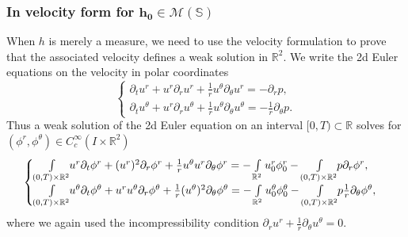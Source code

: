 \documentclass[JEP,XML,SOM,Unicode,NoFloatCountersInSection,published]{cedram}
\theoremstyle{plain}
\theoremstyle{definition}
\newcommand{\bbR}{\mathbb R}
\begin{document}
\subsubsection{In velocity form for $\boldsymbol{h_0\in \mathcal{M}\left(\mathbb{S}\right)}$}

When $h$ is merely a measure, we need to use the velocity formulation to prove that the associated velocity defines a weak solution in $\bbR^2$. We write the 2d Euler equations on the velocity in polar coordinates
\[
\begin{cases}
\partial_t u^r+u^r\partial_ru^r+\frac{1}{r}u^\theta \partial_\theta u^r=-\partial_r p,\\
\partial_t u^\theta+u^r\partial_ru^\theta+\frac{1}{r}u^\theta \partial_\theta u^\theta=-\frac{1}{r}\partial_\theta p.
\end{cases}
\]
Thus a weak solution of the 2d Euler equation on an interval $[0,T)\subset \mathbb{R}$ solves for $(\phi^r,\phi^\theta)\in C^{\infty}_c\left(I\times \mathbb{R}^2\right)$
\begin{equation}\label{eq: weak euler}
\begin{cases}
\int\limits_{(0,T)\times\mathbb{R}^2}\hspace*{-1mm}u^r \partial_t\phi^r+(u^r)^2 \partial_r \phi^r+\frac{1}{r}u^\theta u^r \partial_\theta \phi^r=-\int\limits_{\mathbb{R}^2}u^r_0\phi^r_0-\int\limits_{(0,T)\times\mathbb{R}^2}\hspace*{-1mm} p \partial_r \phi^r,\\
\int\limits_{(0,T)\times\mathbb{R}^2}\hspace*{-1mm}u^\theta \partial_t\phi^\theta+u^r u^\theta \partial_r \phi^\theta+\frac{1}{r}(u^\theta)^2 \partial_\theta \phi^\theta=-\int\limits_{\mathbb{R}^2}u^\theta_0\phi^\theta_0-\int\limits_{(0,T)\times\mathbb{R}^2}\hspace*{-1mm} p \frac{1}{r}\partial_\theta \phi^\theta,
\end{cases}
\end{equation}
where we again used the incompressibility condition $\partial_r u^r+\frac{1}{r}\partial_\theta u^\theta=0$.
\end{document}
